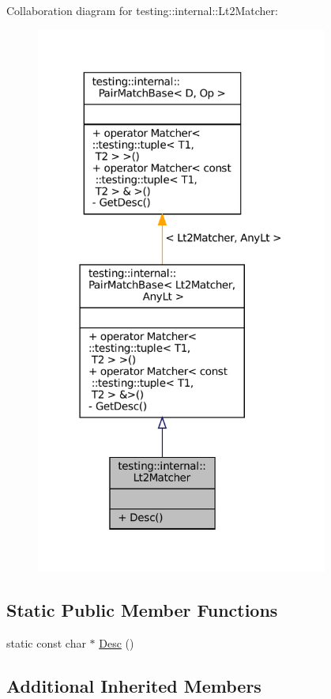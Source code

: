 Collaboration diagram for testing\+:\+:internal\+:\+:Lt2\+Matcher\+:
\nopagebreak
\begin{figure}[H]
\begin{center}
\leavevmode
\includegraphics[width=272pt]{classtesting_1_1internal_1_1Lt2Matcher__coll__graph}
\end{center}
\end{figure}
\subsection*{Static Public Member Functions}
\begin{DoxyCompactItemize}
\item 
static const char $\ast$ \hyperlink{classtesting_1_1internal_1_1Lt2Matcher_ae5d3129050392105e21755f39b933b09}{Desc} ()
\end{DoxyCompactItemize}
\subsection*{Additional Inherited Members}


